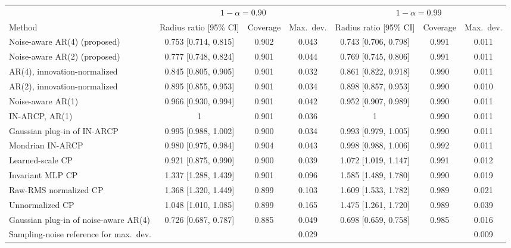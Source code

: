 \begin{tabular}{lcccccc}
\toprule
 & \multicolumn{3}{c}{$1-\alpha=0.90$} & \multicolumn{3}{c}{$1-\alpha=0.99$}\\
\cmidrule(lr){2-4}\cmidrule(lr){5-7}
Method & Radius ratio [95\% CI] & Coverage & Max.\ dev. & Radius ratio [95\% CI] & Coverage & Max.\ dev.\\
\midrule
Noise-aware AR(4) (proposed) & 0.753 [0.714, 0.815] & 0.902 & 0.043 & 0.743 [0.706, 0.798] & 0.991 & 0.011\\
Noise-aware AR(2) (proposed) & 0.777 [0.748, 0.824] & 0.901 & 0.044 & 0.769 [0.745, 0.806] & 0.991 & 0.011\\
AR(4), innovation-normalized & 0.845 [0.805, 0.905] & 0.901 & 0.032 & 0.861 [0.822, 0.918] & 0.990 & 0.011\\
AR(2), innovation-normalized & 0.895 [0.855, 0.953] & 0.901 & 0.034 & 0.898 [0.857, 0.953] & 0.990 & 0.010\\
Noise-aware AR(1) & 0.966 [0.930, 0.994] & 0.901 & 0.042 & 0.952 [0.907, 0.989] & 0.990 & 0.011\\
IN-ARCP, AR(1) & 1 & 0.901 & 0.036 & 1 & 0.990 & 0.011\\
Gaussian plug-in of IN-ARCP & 0.995 [0.988, 1.002] & 0.900 & 0.034 & 0.993 [0.979, 1.005] & 0.990 & 0.011\\
Mondrian IN-ARCP & 0.980 [0.975, 0.984] & 0.904 & 0.043 & 0.998 [0.988, 1.006] & 0.992 & 0.011\\
Learned-scale CP & 0.921 [0.875, 0.990] & 0.900 & 0.039 & 1.072 [1.019, 1.147] & 0.991 & 0.012\\
Invariant MLP CP & 1.337 [1.288, 1.439] & 0.901 & 0.096 & 1.585 [1.489, 1.780] & 0.990 & 0.019\\
Raw-RMS normalized CP & 1.368 [1.320, 1.449] & 0.899 & 0.103 & 1.609 [1.533, 1.782] & 0.989 & 0.021\\
Unnormalized CP & 1.048 [1.010, 1.085] & 0.899 & 0.165 & 1.475 [1.261, 1.720] & 0.989 & 0.039\\
Gaussian plug-in of noise-aware AR(4) & 0.726 [0.687, 0.787] & 0.885 & 0.049 & 0.698 [0.659, 0.758] & 0.985 & 0.016\\
\midrule
Sampling-noise reference for max.\ dev. & & & 0.029 & & & 0.009\\
\bottomrule
\end{tabular}

